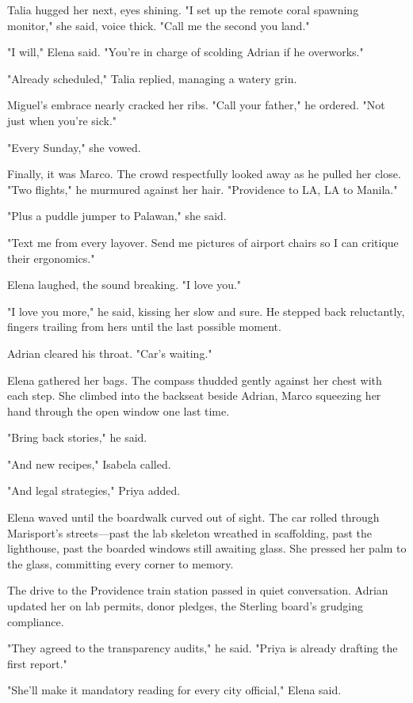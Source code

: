 Talia hugged her next, eyes shining. "I set up the remote coral spawning monitor," she said, voice thick. "Call me the second you land."

"I will," Elena said. "You're in charge of scolding Adrian if he overworks."

"Already scheduled," Talia replied, managing a watery grin.

Miguel's embrace nearly cracked her ribs. "Call your father," he ordered. "Not just when you're sick."

"Every Sunday," she vowed.

Finally, it was Marco. The crowd respectfully looked away as he pulled her close. "Two flights," he murmured against her hair. "Providence to LA, LA to Manila."

"Plus a puddle jumper to Palawan," she said.

"Text me from every layover. Send me pictures of airport chairs so I can critique their ergonomics."

Elena laughed, the sound breaking. "I love you."

"I love you more," he said, kissing her slow and sure. He stepped back reluctantly, fingers trailing from hers until the last possible moment.

Adrian cleared his throat. "Car's waiting."

Elena gathered her bags. The compass thudded gently against her chest with each step. She climbed into the backseat beside Adrian, Marco squeezing her hand through the open window one last time.

"Bring back stories," he said.

"And new recipes," Isabela called.

"And legal strategies," Priya added.

Elena waved until the boardwalk curved out of sight. The car rolled through Marisport's streets—past the lab skeleton wreathed in scaffolding, past the lighthouse, past the boarded windows still awaiting glass. She pressed her palm to the glass, committing every corner to memory.

\bigskip

The drive to the Providence train station passed in quiet conversation. Adrian updated her on lab permits, donor pledges, the Sterling board's grudging compliance.

"They agreed to the transparency audits," he said. "Priya is already drafting the first report."

"She'll make it mandatory reading for every city official," Elena said.

